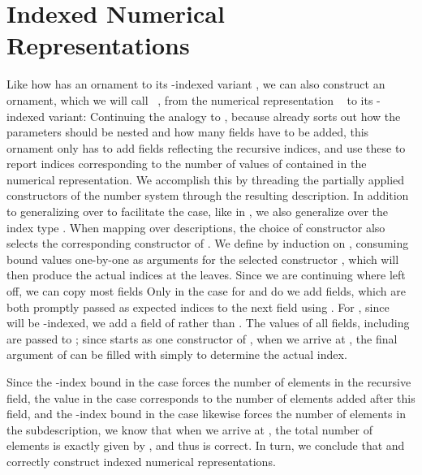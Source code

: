 \section{Indexed Numerical Representations}\label{sec:itrieo}
Like how  has an ornament  to its \bN{}-indexed variant , we can also construct an ornament, which we will call \ , from the numerical representation \  to its -indexed variant:
Continuing the analogy to , because  already sorts out how the parameters should be nested and how many fields have to be added, this ornament only has to add fields reflecting the recursive indices, and use these to report indices corresponding to the number of values of  contained in the numerical representation. We accomplish this by threading the partially applied constructors  of the number system  through the resulting description. In addition to generalizing over  to facilitate the  case, like in , we also generalize over the index type . When mapping over descriptions, the choice of constructor also selects the corresponding constructor of .
We define  by induction on , consuming bound values one-by-one as arguments for the selected constructor , which will then produce the actual indices at the leaves. Since we are continuing where  left off, we can copy most fields
Only in the case for  and  do we add fields, which are both promptly passed as expected indices to the next field using . For , since \  will be -indexed, we add a field of  rather than . The values of all fields, including  are passed to ; since  starts as one constructor  of , when we arrive at , the final argument of  can be filled with simply  to determine the actual index.

Since the -index bound in the  case forces the number of elements in the recursive field, the value in the  case corresponds to the number of elements added after this field, and the -index bound in the  case likewise forces the number of elements in the subdescription, we know that when we arrive at , the total number of elements is exactly given by , and thus  is correct. In turn, we conclude that  and  correctly construct indexed numerical representations. 


